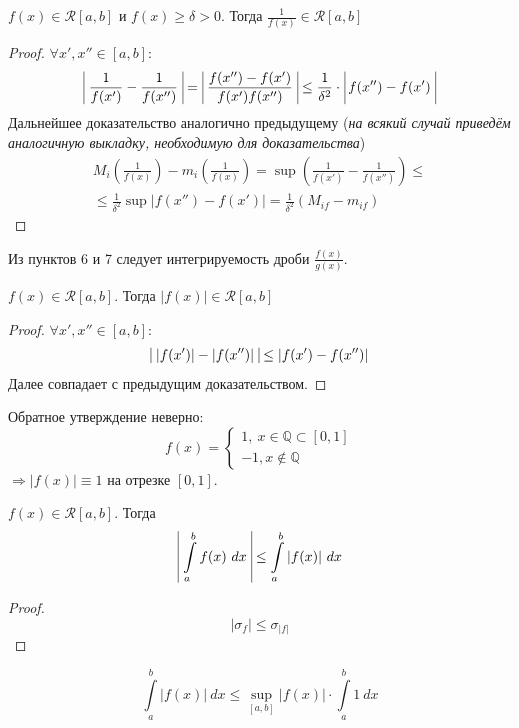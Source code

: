 \begin{numtheorem}
    $f(x) \in \mathcal{R}[a, b]$ и $f(x) \geq \delta > 0$. Тогда $\frac{1}{f(x)} \in \mathcal{R}[a, b]$
\end{numtheorem}
\begin{proof}
    $\forall x', x'' \in [a, b]$:
    \begin{align*}
        \vline\ \frac{1}{f(x')} - \frac{1}{f(x'')}\ \vline =\ \vline \frac{f(x'') - f(x')}{f(x')f(x'')}\ \vline \leq \frac{1}{\delta^2}\cdot\ \vline f(x'')-f(x')\ \vline
    \end{align*}
    Дальнейшее доказательство аналогично предыдущему (\textit{на всякий случай приведём аналогичную выкладку, необходимую для доказательства})
    \begin{multline*}
        M_i(\frac{1}{f(x)})-m_i(\frac{1}{f(x)})=\sup(\frac{1}{f(x')}-\frac{1}{f(x'')})\leq\\
        \leq\frac{1}{\delta^2}\sup|f(x'')-f(x')|=\frac{1}{\delta^2}(M_{if}-m_{if})
    \end{multline*}
\end{proof}
\begin{consequense}
    Из пунктов 6 и 7 следует интегрируемость дроби $\frac{f(x)}{g(x)}$.
\end{consequense}
\begin{numtheorem}
    $f(x) \in \mathcal{R}[a, b]$. Тогда $|f(x)| \in \mathcal{R}[a, b]$
\end{numtheorem}
\begin{proof}
    $\forall x', x'' \in [a, b]$:
    \begin{align*}
        \vline\ |f(x')| - |f(x'')|\ \vline \leq |f(x')-f(x'')|
    \end{align*}
    Далее совпадает с предыдущим доказательством.
\end{proof}
\begin{comm}
    Обратное утверждение неверно:
    \[f(x) = \begin{cases}
        1, \ x\in\mathbb{Q}\subset [0, 1]\\
        -1, x\notin\mathbb{Q}
    \end{cases}\]
    $\Rightarrow |f(x)| \equiv 1$ на отрезке $[0, 1]$.
\end{comm}
\begin{numtheorem}
    $f(x) \in \mathcal{R}[a, b]$. Тогда 
    \[\vline\ \int\limits_{a}^{b}f(x)\ dx\ \vline\leq \int\limits_{a}^{b} |f(x)|\ dx\]
\end{numtheorem}
\begin{proof}
    \[|\sigma_f| \leq \sigma_{|f|}\]
\end{proof}
\begin{comm}
    \[\int\limits_{a}^{b}|f(x)|\ dx \leq \sup \limits_{[a, b]} |f(x)|\cdot\int\limits_{a}^{b}1\ dx\]
\end{comm}
\setcounter{thmcount}{0}
